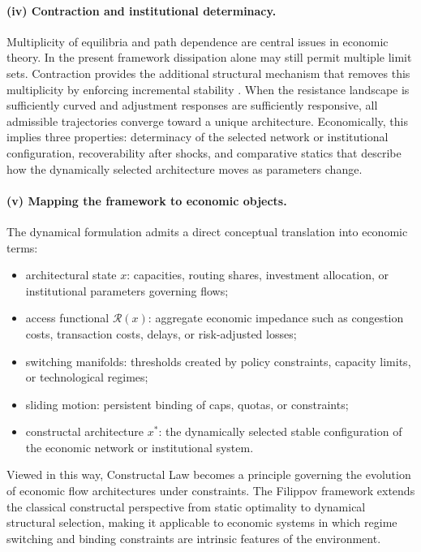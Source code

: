 \documentclass[12pt]{article}
\theoremstyle{plain}
\theoremstyle{definition}
\theoremstyle{remark}
\begin{document}
\paragraph{(iv) Contraction and institutional determinacy.}

Multiplicity of equilibria and path dependence are central issues in
economic theory.
In the present framework dissipation alone may still permit multiple
limit sets.
Contraction provides the additional structural mechanism that removes
this multiplicity by enforcing incremental stability
\cite{LohmillerSlotine1998}.
When the resistance landscape is sufficiently curved and adjustment
responses are sufficiently responsive, all admissible trajectories
converge toward a unique architecture.
Economically, this implies three properties:
determinacy of the selected network or institutional configuration,
recoverability after shocks, and comparative statics that describe how
the dynamically selected architecture moves as parameters change.

\paragraph{(v) Mapping the framework to economic objects.}

The dynamical formulation admits a direct conceptual translation into
economic terms:
\begin{itemize}[leftmargin=1.5em]
\item architectural state $x$: capacities, routing shares, investment
allocation, or institutional parameters governing flows;
\item access functional $\mathcal R(x)$: aggregate economic impedance
such as congestion costs, transaction costs, delays, or risk-adjusted
losses;
\item switching manifolds: thresholds created by policy constraints,
capacity limits, or technological regimes;
\item sliding motion: persistent binding of caps, quotas, or
constraints;
\item constructal architecture $x^\ast$: the dynamically selected
stable configuration of the economic network or institutional system.
\end{itemize}

Viewed in this way, Constructal Law becomes a principle governing the
evolution of economic flow architectures under constraints.
The Filippov framework extends the classical constructal perspective
from static optimality to dynamical structural selection,
making it applicable to economic systems in which regime switching and
binding constraints are intrinsic features of the environment.
\end{document}
